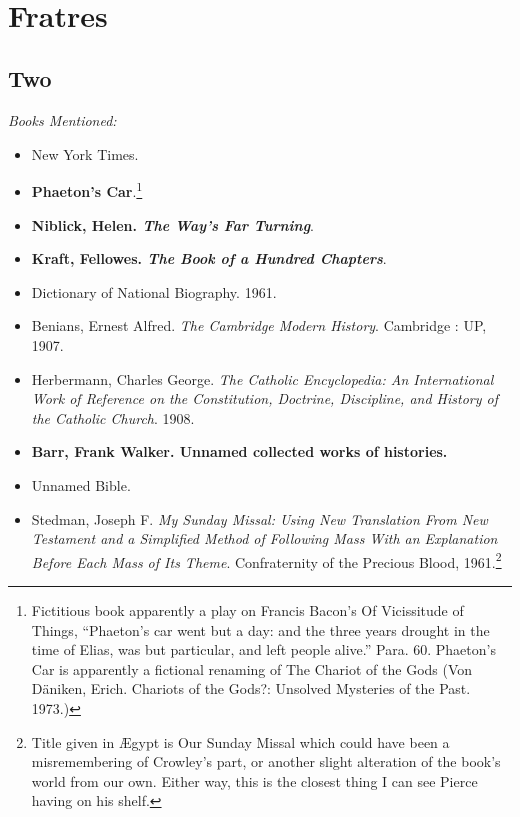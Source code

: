\documentclass[twoside,10pt]{report}
\newcommand\fleuron{\begin{turn}{45}\Large \ding{166}\end{turn}}
\newcommand\doublefleuron{%
	\reflectbox{\fleuron}\AC\staveXLIX\reflectbox{\AC}\fleuron}
\newcommand\fleuronbar{%
	{\huge\LinearACCCXIII}\xrfill[1.3ex]{1pt}\doublefleuron\xrfill[1.3ex]{1pt}\reflectbox{\huge\LinearACCCXIII}}
\newcommand\nbvspace[1][3]{\vspace*{\stretch{#1}}}
\begin{document}
\begin{center}
\vfill
\shadowoffset{1pt}
\shadowtext{%
{\color{Mahogany}\fontsize{60}{64}\staveLXIII}}\\
\nbvspace[1]
\end{center}

\chapter{Fratres}
\section{Two}
\textit{Books Mentioned:}
\begin{itemize}
\item New York Times.
\item \textbf{Phaeton’s Car}.\footnote{Fictitious book apparently a play on Francis Bacon’s Of Vicissitude of Things, “Phaeton’s car went but a day: and the three years drought in the time of Elias, was but particular, and left people alive.” Para. 60. Phaeton’s Car is apparently a fictional renaming of The Chariot of the Gods (Von Däniken, Erich. Chariots of the Gods?: Unsolved Mysteries of the Past. 1973.)}
\item \textbf{Niblick, Helen. \textit{The Way’s Far Turning}}.
\item \textbf{Kraft, Fellowes. \textit{The Book of a Hundred Chapters}}.
\item Dictionary of National Biography. 1961.\cite{1961}
\item Benians, Ernest Alfred. \textit{The Cambridge Modern History}. Cambridge : UP, 1907.\cite{Benians1907}
\item Herbermann, Charles George. \textit{The Catholic Encyclopedia: An International Work of Reference on the Constitution, Doctrine, Discipline, and History of the Catholic Church}. 1908.\cite{Herbermann1908}
\item \textbf{Barr, Frank Walker. Unnamed collected works of histories.}
\item Unnamed Bible.
\item Stedman, Joseph F. \textit{My Sunday Missal: Using New Translation From New Testament and a Simplified Method of Following Mass With an Explanation Before Each Mass of Its Theme}. Confraternity of the Precious Blood, 1961.\footnote{Title given in Ægypt is Our Sunday Missal which could have been a misremembering of Crowley’s part, or another slight alteration of the book’s world from our own. Either way, this is the closest thing I can see Pierce having on his shelf.}

\end{itemize}
\end{document}

